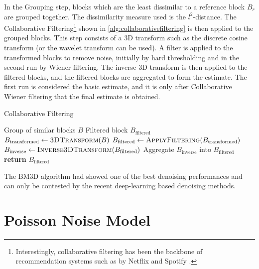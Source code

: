 In the Grouping step, blocks which are the least dissimilar to a reference block $B_r$ are grouped together. The dissimilarity measure used is the $l^2$-distance. The Collaborative Filtering\footnote{Interestingly, collaborative filtering has been the backbone of recommendation systems such as by Netflix and Spotify \cite{bellLessonsNetflixPrize2007,drorYahooMusicDataset2012}.} shown in \cref{alg:collaborativefiltering} is then applied to the grouped blocks. This step consists of a 3D transform such as the discrete cosine transform (or the wavelet transform can be used). A filter is applied to the transformed blocks to remove noise, initially by hard thresholding and in the second run by Wiener filtering. The inverse 3D transform is then applied to the filtered blocks, and the filtered blocks are aggregated to form the estimate. The first run is considered the basic estimate, and it is only after Collaborative Wiener filtering that the final estimate is obtained.
    
\begin{algorithm}
    \caption{Collaborative Filtering}\label{alg:collaborativefiltering}
    \begin{algorithmic}[1]
    \Require Group of similar blocks $B$
    \Ensure Filtered block $B_{\text{filtered}}$
        \State $B_{\text{transformed}} \gets \textsc{3DTransform}(B)$
        \State $B_{\text{filtered}} \gets \textsc{ApplyFiltering}(B_{\text{transformed}})$ 
        \State $B_{\text{inverse}} \gets \textsc{Inverse3DTransform}(B_{\text{filtered}})$
        \State Aggregate $B_{\text{inverse}}$ into $B_{\text{filtered}}$
        \State \textbf{return} $B_{\text{filtered}}$
    \EndProcedure
    \end{algorithmic}
\end{algorithm}

The \gls{BM3D} algorithm had showed one of the best denoising performances and can only be contested by the recent deep-learning based denoising methods. 

\section{Poisson Noise Model}\label{sec:poisson-noise-model}

